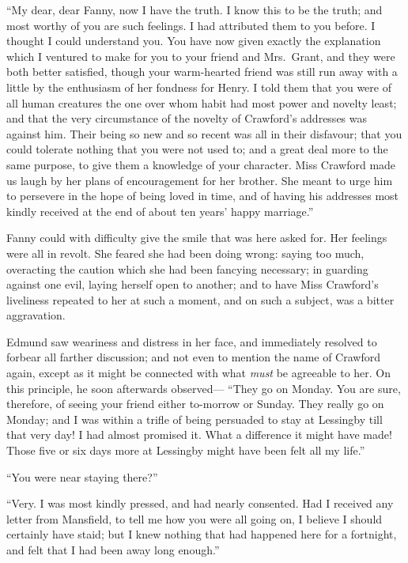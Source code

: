 ``My dear, dear Fanny, now I have the truth.  I know this
to be the truth; and most worthy of you are such feelings.
I had attributed them to you before.  I thought I could
understand you.  You have now given exactly the explanation
which I ventured to make for you to your friend and Mrs.\ Grant,
and they were both better satisfied, though your warm-hearted
friend was still run away with a little by the enthusiasm
of her fondness for Henry.  I told them that you were
of all human creatures the one over whom habit had most
power and novelty least; and that the very circumstance
of the novelty of Crawford's addresses was against him.
Their being so new and so recent was all in their disfavour;
that you could tolerate nothing that you were not used to;
and a great deal more to the same purpose, to give them
a knowledge of your character.  Miss Crawford made us
laugh by her plans of encouragement for her brother.
She meant to urge him to persevere in the hope of being
loved in time, and of having his addresses most kindly
received at the end of about ten years' happy marriage.''

Fanny could with difficulty give the smile that was
here asked for.  Her feelings were all in revolt.
She feared she had been doing wrong:  saying too much,
overacting the caution which she had been fancying necessary;
in guarding against one evil, laying herself open
to another; and to have Miss Crawford's liveliness
repeated to her at such a moment, and on such a subject,
was a bitter aggravation.

Edmund saw weariness and distress in her face,
and immediately resolved to forbear all farther discussion;
and not even to mention the name of Crawford again,
except as it might be connected with what \emph{must} be agreeable
to her.  On this principle, he soon afterwards observed---%
``They go on Monday.  You are sure, therefore, of seeing
your friend either to-morrow or Sunday.  They really go
on Monday; and I was within a trifle of being persuaded
to stay at Lessingby till that very day!  I had almost
promised it.  What a difference it might have made!
Those five or six days more at Lessingby might have been
felt all my life.''

``You were near staying there?''

``Very.  I was most kindly pressed, and had nearly consented.
Had I received any letter from Mansfield, to tell me how you
were all going on, I believe I should certainly have staid;
but I knew nothing that had happened here for a fortnight,
and felt that I had been away long enough.''

